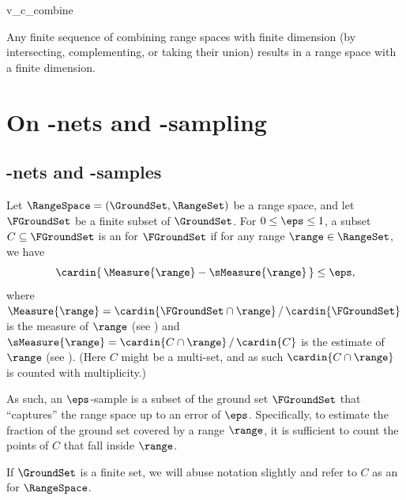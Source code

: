 \begin{fragment}{v_c_combine}
    \begin{corollary}
        Any finite sequence of combining range spaces with finite \VC
        dimension (by intersecting, complementing, or taking their
        union) results in a range space with a finite \VC dimension.
        
    \end{corollary}
\end{fragment}


\section{On -nets and
   -sampling}


\subsection{-nets and
   -samples}


\begin{defn}
    Let $\RangeSpace = (\GroundSet,\RangeSet)$ be a range space, and
    let $\FGroundSet$ be a finite subset of $\GroundSet$. For $0 \leq
    \eps \leq 1$, a subset $C \subseteq \FGroundSet$ is an
     for $\FGroundSet$ if
    for any range $\range \in \RangeSet$, we have
    \begin{align*}
      \cardin{\, \Measure{\range} - \sMeasure{\range} \bigr.\, }%
      \leq%
      \eps,
    \end{align*}
    where
    $\Measure{\range} = {\cardin{\FGroundSet \cap \range}} \, /\,
    {\cardin{\FGroundSet}}$ is the measure of $\range$ (see
    ) and
    $\sMeasure{\range} = {\cardin{C \cap \range}} \, /\,{\cardin{C}}$
    is the estimate of $\range$ (see ).  (Here $C$
    might be a multi-set, and as such $\cardin{C \cap \range}$ is
    counted with multiplicity.)
\end{defn}

As such, an $\eps$-sample is a subset of the ground set $\FGroundSet$
that ``captures'' the range space up to an error of
$\eps$. Specifically, to estimate the fraction of the ground set
covered by a range $\range$, it is sufficient to count the points of
$C$ that fall inside $\range$.

If $\GroundSet$ is a finite set, we will abuse notation slightly and
refer to $C$ as an 
for $\RangeSpace$.

